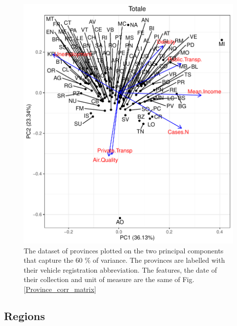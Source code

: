 \documentclass[
12pt, %
a4paper, %
oneside, %
headinclude,footinclude, %
BCOR5mm, %
]{scrartcl}
\begin{document}
\begin{figure}[h]
\begin{center}
\includegraphics[scale=1]{Pic/Provinces_PCA_FULL.pdf}
\caption{The dataset of provinces plotted on the two principal components that capture the 60 $\% $ of variance. The provinces are labelled with their vehicle registration abbreviation. The features, the date of their collection and unit of measure are the same of Fig. \ref{Province_corr_matrix} }
\label{Provinces_PCA_FULL}
\end{center}
\end{figure}

\clearpage

\subsection{Regions}
\end{document}
